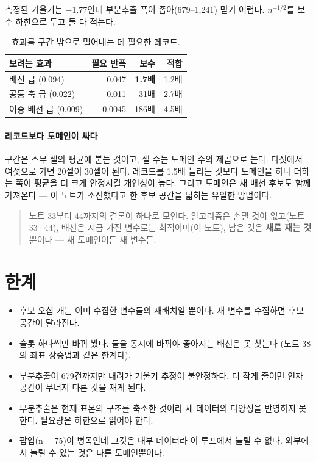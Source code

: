 \documentclass[10pt]{article}
\begin{document}
측정된 기울기는 $-$1.77인데 부분추출 폭이 좁아(679--1,241) 믿기 어렵다.
$n^{-1/2}$를 보수 하한으로 두고 둘 다 적는다.

\begin{table}[t]
\centering\tsize
\caption{효과를 구간 밖으로 밀어내는 데 필요한 레코드.}
\begin{tabular}{lrrr}
\toprule
보려는 효과 & 필요 반폭 & 보수 & 적합 \\
\midrule
배선 급 (0.094) & 0.047 & \textbf{1.7배} & 1.2배 \\
공통 축 급 (0.022) & 0.011 & 31배 & 2.7배 \\
이중 배선 급 (0.009) & 0.0045 & 186배 & 4.5배 \\
\bottomrule
\end{tabular}
\end{table}


\paragraph{레코드보다 도메인이 싸다}
구간은 스무 셀의 평균에 붙는 것이고, 셀 수는 도메인 수의 제곱으로 는다.
다섯에서 여섯으로 가면 20셀이 30셀이 된다. 레코드를 1.5배 늘리는 것보다
도메인을 하나 더하는 쪽이 평균을 더 크게 안정시킬 개연성이 높다. 그리고
도메인은 새 배선 후보도 함께 가져온다 --- 이 노트가 소진했다고 한 후보 공간을
넓히는 유일한 방법이다.

\begin{quote}\fontsize{9.5}{11.5}\selectfont
노트 33부터 44까지의 결론이 하나로 모인다. 알고리즘은 손댈 것이 없고(노트 33·44),
배선은 지금 가진 변수로는 최적이며(이 노트), 남은 것은 \textbf{새로 재는 것}
뿐이다 --- 새 도메인이든 새 변수든.
\end{quote}

\section{한계}

\begin{itemize}[leftmargin=1.1em,itemsep=0.15em]
\item 후보 오십 개는 이미 수집한 변수들의 재배치일 뿐이다. 새 변수를 수집하면
      후보 공간이 달라진다.
\item 슬롯 하나씩만 바꿔 봤다. 둘을 동시에 바꿔야 좋아지는 배선은 못 찾는다
      (노트 38의 좌표 상승법과 같은 한계다).
\item 부분추출이 679건까지만 내려가 기울기 추정이 불안정하다. 더 작게 줄이면
      인자 공간이 무너져 다른 것을 재게 된다.
\item 부분추출은 현재 표본의 구조를 축소한 것이라 새 데이터의 다양성을 반영하지
      못한다. 필요량은 하한으로 읽어야 한다.
\item 팝업(n$=$75)이 병목인데 그것은 내부 데이터라 이 루프에서 늘릴 수 없다.
      외부에서 늘릴 수 있는 것은 다른 도메인뿐이다.
\end{itemize}
\end{document}
